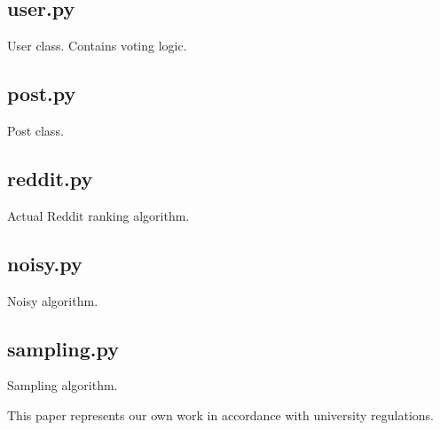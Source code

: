 \documentclass[12pt, oneside]{amsart}
\begin{document}
\subsection{user.py}
User class. Contains voting logic.



\newpage

\subsection{post.py}
Post class. 



\newpage

\subsection{reddit.py}
Actual Reddit ranking algorithm.



\newpage

\subsection{noisy.py}
Noisy algorithm.



\newpage

\subsection{sampling.py}
Sampling algorithm.




\newpage
\nocite{*}
{}


\vfill
This paper represents our own work in accordance with university regulations.
\end{document}
